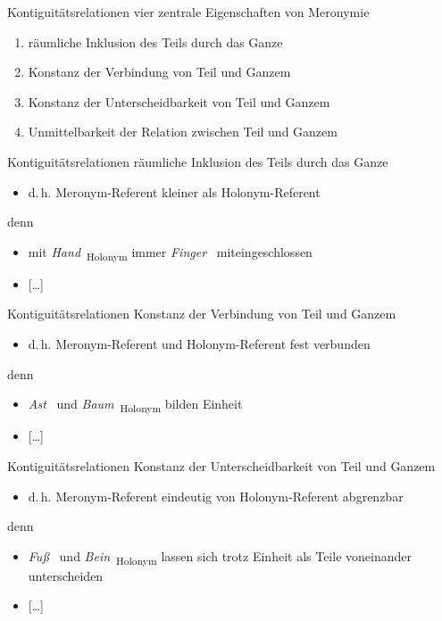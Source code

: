 \begin{frame}{Kontiguitätsrelationen}
\onslide<+->
vier zentrale Eigenschaften von Meronymie
\begin{enumerate}
	\item		räumliche Inklusion des Teils durch das Ganze
	\item		Konstanz der Verbindung von Teil und Ganzem
	\item		Konstanz der Unterscheidbarkeit von Teil und Ganzem
	\item		Unmittelbarkeit der Relation zwischen Teil und Ganzem
\end{enumerate}
\end{frame}

\begin{frame}{Kontiguitätsrelationen}
\onslide<+->
räumliche Inklusion des Teils durch das Ganze
\begin{itemize}[<+->]
	\item		d.\,h. Meronym-Referent kleiner als Holonym-Referent
\end{itemize}
\onslide<+->
\Zeile
denn
\begin{itemize}[<+->]
	\item		mit \textit{Hand}~\textsubscript{\alert{Holonym}} immer \textit{Finger}~\textsubscript{} miteingeschlossen
	\item		{[\ldots]}
\end{itemize}
\end{frame}

\begin{frame}{Kontiguitätsrelationen}
\onslide<+->
Konstanz der Verbindung von Teil und Ganzem
\begin{itemize}[<+->]
	\item		d.\,h. Meronym-Referent und Holonym-Referent fest verbunden
\end{itemize}
\onslide<+->
\Zeile
denn
\begin{itemize}[<+->]
	\item		\textit{Ast}~\textsubscript{} und \textit{Baum}~\textsubscript{\alert{Holonym}} bilden Einheit
	\item		{[\ldots]}
\end{itemize}
\end{frame}

\begin{frame}{Kontiguitätsrelationen}
\onslide<+->
Konstanz der Unterscheidbarkeit von Teil und Ganzem
\begin{itemize}[<+->]
	\item		d.\,h. Meronym-Referent eindeutig von Holonym-Referent abgrenzbar
\end{itemize}
\onslide<+->
\Zeile
denn
\begin{itemize}[<+->]
	\item		\textit{Fuß}~\textsubscript{} und \textit{Bein}~\textsubscript{\alert{Holonym}} lassen sich trotz Einheit als Teile voneinander unterscheiden
	\item		{[\ldots]}
\end{itemize}
\end{frame}

